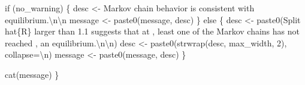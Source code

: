 \documentclass[
  letterpaper,
  DIV=11,
  numbers=noendperiod]{scrartcl}
\newenvironment{Shaded}{\begin{snugshade}}{\end{snugshade}}
\newcommand{\CharTok}[1]{\textcolor[rgb]{0.13,0.47,0.30}{#1}}
\newcommand{\ControlFlowTok}[1]{\textcolor[rgb]{0.00,0.23,0.31}{#1}}
\newcommand{\DecValTok}[1]{\textcolor[rgb]{0.68,0.00,0.00}{#1}}
\newcommand{\NormalTok}[1]{\textcolor[rgb]{0.00,0.23,0.31}{#1}}
\newcommand{\OperatorTok}[1]{\textcolor[rgb]{0.37,0.37,0.37}{#1}}
\newcommand{\SpecialCharTok}[1]{\textcolor[rgb]{0.37,0.37,0.37}{#1}}
\newcommand{\StringTok}[1]{\textcolor[rgb]{0.13,0.47,0.30}{#1}}
\begin{document}
\begin{Shaded}
\begin{Highlighting}[]
  \ControlFlowTok{if}\NormalTok{ (no\_warning) \{}
\NormalTok{    desc }\OperatorTok{\textless{}{-}} \StringTok{\textquotesingle{}Markov chain behavior is consistent with equilibrium.}\CharTok{\textbackslash{}n\textbackslash{}n}\StringTok{\textquotesingle{}}
\NormalTok{    message }\OperatorTok{\textless{}{-}}\NormalTok{ paste0(message, desc)}
\NormalTok{  \} }\ControlFlowTok{else}\NormalTok{ \{}
\NormalTok{    desc }\OperatorTok{\textless{}{-}}\NormalTok{ paste0(}\StringTok{\textquotesingle{}Split hat}\SpecialCharTok{\{R\}}\StringTok{ larger than 1.1 suggests that at \textquotesingle{}}\NormalTok{,}
                   \StringTok{\textquotesingle{}least one of the Markov chains has not reached \textquotesingle{}}\NormalTok{,}
                   \StringTok{\textquotesingle{}an equilibrium.}\CharTok{\textbackslash{}n\textbackslash{}n}\StringTok{\textquotesingle{}}\NormalTok{)}
\NormalTok{    desc }\OperatorTok{\textless{}{-}}\NormalTok{ paste0(strwrap(desc, max\_width, }\DecValTok{2}\NormalTok{), collapse}\OperatorTok{=}\StringTok{\textquotesingle{}}\CharTok{\textbackslash{}n}\StringTok{\textquotesingle{}}\NormalTok{)}
\NormalTok{    message }\OperatorTok{\textless{}{-}}\NormalTok{ paste0(message, desc)}
\NormalTok{  \}}
  
\NormalTok{  cat(message)}
\NormalTok{\}}
\end{Highlighting}
\end{Shaded}
\end{document}
